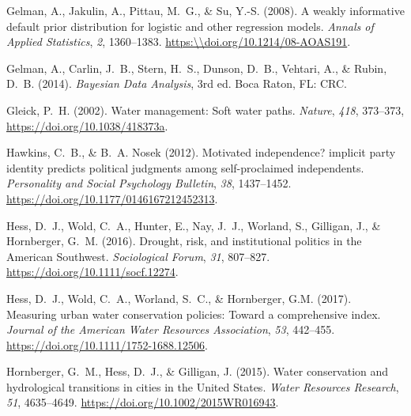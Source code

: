 \documentclass[draft,linenumbers]{agujournal}
\begin{document}
\begin{thebibliography}{33}
  Gelman, A., Jakulin, A., Pittau, M.~G., \& Su, Y.-S. (2008).
  A weakly informative default prior distribution for logistic and other
  regression models.
  \textit{Annals of Applied Statistics}, \textit{2}, 1360--1383.
  \url{https:\\doi.org/10.1214/08-AOAS191}.

  Gelman, A., Carlin, J.~B., Stern, H.~S., Dunson, D.~B., Vehtari, A., \&
  Rubin, D.~B. (2014).
  \textit{{B}ayesian Data Analysis}, 3rd ed.
  Boca Raton, FL: CRC.

  Gleick, P.~H. (2002).
  Water management: {S}oft water paths.
  \textit{Nature},
  \textit{418}, 373--373, \url{https://doi.org/10.1038/418373a}.

  Hawkins, C.~B., \& B.~A. Nosek (2012).
  Motivated independence? implicit party identity predicts political judgments
  among self-proclaimed independents.
  \textit{Personality and Social Psychology Bulletin}, \textit{38}, 1437--1452.
  \url{https://doi.org/10.1177/0146167212452313}.

  Hess, D.~J., Wold, C.~A., Hunter, E., Nay, J.~J., Worland, S., Gilligan, J.,
  \& Hornberger, G.~M. (2016).
  Drought, risk, and institutional politics in the {A}merican {S}outhwest.
  \textit{Sociological Forum}, \textit{31}, 807--827.
  \url{https://doi.org/10.1111/socf.12274}.

  Hess, D.~J., Wold, C.~A., Worland, S.~C., \& Hornberger, G.M. (2017).
  Measuring urban water conservation policies: Toward a comprehensive index.
  \textit{Journal of the American Water Resources Association},
  \textit{53}, 442--455.
  \url{https://doi.org/10.1111/1752-1688.12506}.

  Hornberger, G.~M., Hess, D.~J., \& Gilligan, J. (2015).
  Water conservation and hydrological transitions in cities in the {U}nited {S}tates.
  \textit{Water Resources Research}, \textit{51}, 4635--4649.
  \url{https://doi.org/10.1002/2015WR016943}.


\end{thebibliography}
\end{document}
